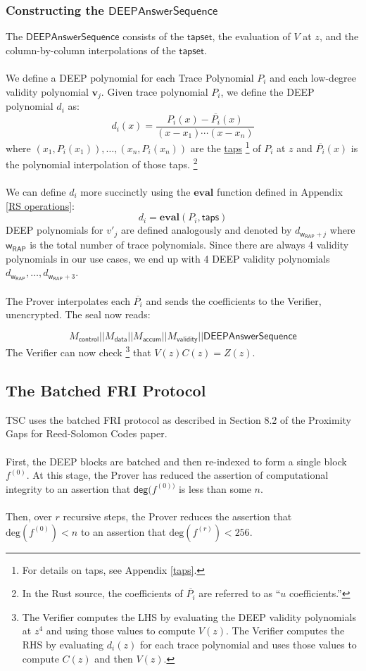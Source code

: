 \documentclass[10pt,letterpaper,titlepage]{article}
\theoremstyle{definition}
\begin{document}
\begin{appendices}
\subsubsection{Constructing the $\mathsf{DEEPAnswerSequence}$}
The $\mathsf{DEEPAnswerSequence}$ consists of the $\mathsf{tapset}$, the evaluation of $V$ at $z$, and the column-by-column interpolations of the $\mathsf{tapset}$.\\
\label{DEEP Polynomials}
\\
We define a DEEP polynomial for each Trace Polynomial $P_i$ and each low-degree validity polynomial $\mathbf{v}_j$. Given trace polynomial $P_i$, we define the DEEP polynomial $d_i$ as: 
\[d_i(x)=\frac{P_i(x)-\overline{P_i}(x)}{(x-x_1)\cdots(x-x_n)}\]
where $(x_1,P_i(x_1)),\ldots,(x_n,P_i(x_n))$ are the \hyperref[taps]{taps}%
\footnote{For details on taps, see Appendix \ref*{taps}.} 
of $P_i$ at $z$ and $\overline{P_i}(x)$ is the polynomial interpolation of those taps.%
\footnote{In the Rust source, the coefficients of $\overline{P_i}$ are referred to as ``$u$ coefficients.'' }
\\
\\
We can define $d_i$ more succinctly using the $\textbf{eval}$ function defined in Appendix \ref{RS operations}:
\[
  d_i=
  \mathbf{eval}(
    P_i,
    \mathsf{taps}
  )\]
DEEP polynomials for $v'_j$ are defined analogously and denoted by $d_{\mathsf{w}_\mathsf{RAP}+j}$ where $\mathsf{w}_\mathsf{RAP}$ is the total number of trace polynomials. 
Since there are always 4 validity polynomials in our use cases, we end up with 4 DEEP validity polynomials $d_{\mathsf{w}_\mathsf{RAP}},\ldots,d_{\mathsf{w}_\mathsf{RAP}+3}$. \\
\\
The Prover interpolates each $\overline{P_i}$ and sends the coefficients to the Verifier, unencrypted. The seal now reads: 

\[
  M_\mathsf{control}||
  M_\mathsf{data}||
  M_\mathsf{accum}||
  M_\mathsf{validity}||
  \mathsf{DEEPAnswerSequence}
\]
The Verifier can now check%
\footnote{
  The Verifier computes the LHS by evaluating the DEEP validity polynomials at $z^4$ and using those values to compute $V(z)$. 
  The Verifier computes the RHS by evaluating $d_i(z)$ for each trace polynomial and uses those values to compute $C(z)$ and then $V(z)$.
  }
that $V(z)C(z)=Z(z)$. 
\subsection{The Batched FRI Protocol}
\label{FRI}
TSC uses the batched FRI protocol as described in Section 8.2 of the Proximity Gaps for Reed-Solomon Codes paper. \\
\\
First, the DEEP blocks are batched and then re-indexed to form a single block $f^{(0)}$. 
At this stage, the Prover has reduced the assertion of computational integrity to an assertion that $\mathsf{deg}(f^{(0))}$ is less than some $n$. \\
\\
Then, over $r$ recursive steps, the Prover reduces the assertion that $\text{deg}(f^{(0)})<n$ to an assertion that $\text{deg}(f^{(r)})<256$. 

\end{appendices}
\end{document}
